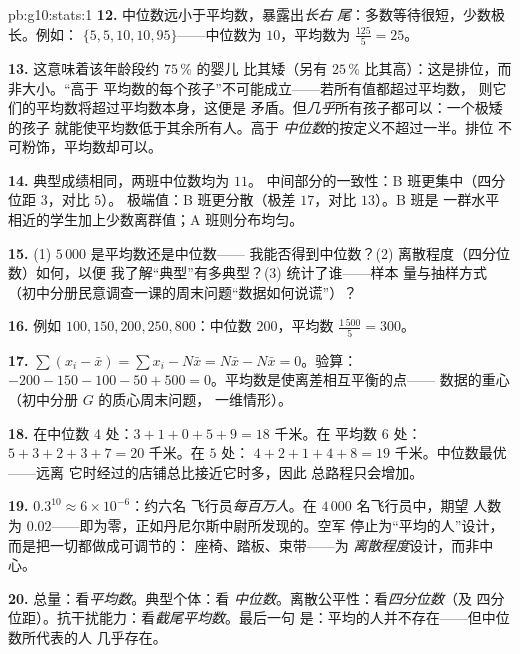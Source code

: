 \begin{solution}{pb:g10:stats:1}
\textbf{12.} 中位数远小于平均数，暴露出\emph{长右
尾}：多数等待很短，少数极长。例如：
$\{5, 5, 10, 10, 95\}$——中位数为 $10$，平均数为
$\frac{125}{5} = 25$。

\textbf{13.} 这意味着该年龄段约 $75\,\%$ 的婴儿
比其矮（另有 $25\,\%$ 比其高）：这是排位，而非大小。“高于
平均数的每个孩子”不可能成立——若所有值都超过平均数，
则它们的平均数将超过平均数本身，这便是
矛盾。但\emph{几乎}所有孩子都可以：一个极矮的孩子
就能使平均数低于其余所有人。高于
\emph{中位数}的按定义不超过一半。排位
不可粉饰，平均数却可以。

\textbf{14.} 典型成绩相同，两班中位数均为 $11$。
中间部分的一致性：B 班更集中（四分位距 $3$，对比 $5$）。
极端值：B 班更分散（极差 $17$，对比 $13$）。B 班是
一群水平相近的学生加上少数离群值；A 班则分布均匀。

\textbf{15.} (1) $5\,000$ 是平均数还是中位数——
我能否得到中位数？(2) 离散程度（四分位数）如何，以便
我了解“典型”有多典型？(3) 统计了谁——样本
量与抽样方式（初中分册民意调查一课的周末问题“数据如何说谎”）？

\textbf{16.} 例如 $100, 150, 200, 250, 800$：中位数
$200$，平均数 $\frac{1\,500}{5} = 300$。

\textbf{17.} $\sum (x_i - \bar x) = \sum x_i - N \bar x =
N\bar x - N\bar x = 0$。验算：$-200 - 150 - 100 - 50 + 500 =
0$。平均数是使离差相互平衡的点——
数据的重心（初中分册 $G$ 的质心周末问题，
一维情形）。

\textbf{18.} 在中位数 $4$ 处：$3 + 1 + 0 + 5 + 9 = 18$ 千米。在
平均数 $6$ 处：$5 + 3 + 2 + 3 + 7 = 20$ 千米。在 $5$ 处：
$4 + 2 + 1 + 4 + 8 = 19$ 千米。中位数最优——远离
它时经过的店铺总比接近它时多，因此
总路程只会增加。

\textbf{19.} $0.3^{10} \approx 6 \times 10^{-6}$：约六名
飞行员\emph{每百万人}。在 $4\,000$ 名飞行员中，期望
人数为 $0.02$——即为零，正如丹尼尔斯中尉所发现的。空军
停止为“平均的人”设计，而是把一切都做成可调节的：
座椅、踏板、束带——为
\emph{离散程度}设计，而非中心。

\textbf{20.} 总量：看\emph{平均数}。典型个体：看
\emph{中位数}。离散公平性：看\emph{四分位数}（及
四分位距）。抗干扰能力：看\emph{截尾平均数}。最后一句
是：平均的人并不存在——但中位数所代表的人
几乎存在。
\end{solution}
